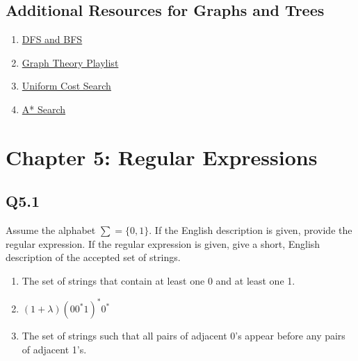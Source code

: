 \documentclass{article}
\begin{document}
\subsection*{Additional Resources for Graphs and Trees}
\begin{enumerate}
    \item \href{https://www.youtube.com/watch?v=zaBhtODEL0w}{DFS and BFS}
    \item \href{https://www.youtube.com/watch?v=DgXR2OWQnLc&list=PLDV1Zeh2NRsDGO4--qE8yH72HFL1Km93P}{Graph Theory Playlist}
    \item \href{https://www.youtube.com/watch?v=dRMvK76xQJI}{Uniform Cost Search}
    \item \href{https://www.youtube.com/watch?v=6TsL96NAZCo}{A* Search}
\end{enumerate}
\newpage
\section*{Chapter 5: Regular Expressions}

\subsection*{Q5.1}
Assume the alphabet $\sum=\{0,1\}$. If the English description is given, provide the regular expression. If the regular expression is given, give a short, English description of the accepted set of strings.
\begin{enumerate}[label=\alph*.]
    \item The set of strings that contain at least one 0 and at least one 1.
    \item $(1+\lambda)(00^*1)^*0^*$
    \item The set of strings such that all pairs of adjacent 0's appear before any pairs of adjacent 1's.
\end{enumerate}
\newpage
\end{document}
